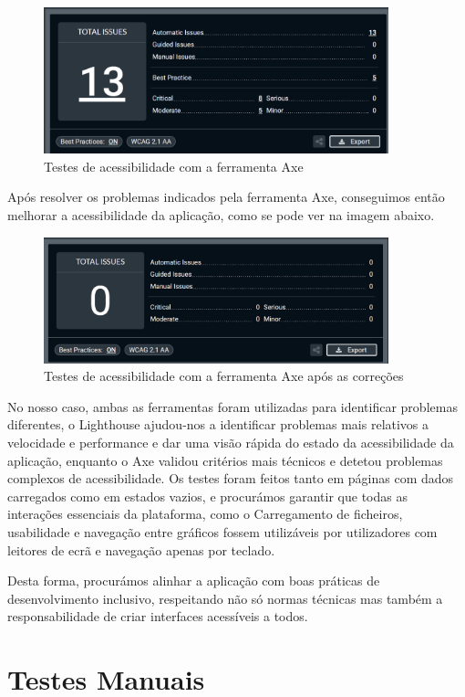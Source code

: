 \begin{figure}[H]
    \centering
    \includegraphics[max width=10cm]{./img/axe}
    \caption{Testes de acessibilidade com a ferramenta Axe}
    \end{figure}


Após resolver os problemas indicados pela ferramenta Axe, conseguimos então melhorar a acessibilidade da aplicação, como se pode ver na imagem abaixo.

\begin{figure}[H]
\centering
\includegraphics[max width=10cm]{./img/axe_after}
\caption{Testes de acessibilidade com a ferramenta Axe após as correções}
\end{figure}

No nosso caso, ambas as ferramentas foram utilizadas para identificar problemas diferentes, o Lighthouse ajudou-nos a identificar problemas mais relativos a velocidade e performance e dar uma visão rápida do estado da acessibilidade da aplicação, enquanto o Axe validou critérios mais técnicos e detetou problemas complexos de acessibilidade. Os testes foram feitos tanto em páginas com dados carregados como em estados vazios, e procurámos garantir que todas as interações essenciais da plataforma,  como o Carregamento de ficheiros, usabilidade e navegação entre gráficos fossem utilizáveis por utilizadores com leitores de ecrã e navegação apenas por teclado.

Desta forma, procurámos alinhar a aplicação com boas práticas de desenvolvimento inclusivo, respeitando não só normas técnicas mas também a responsabilidade de criar interfaces acessíveis a todos.

\section{Testes Manuais}


